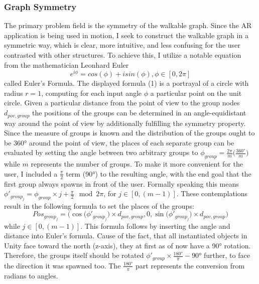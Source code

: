 \documentclass[12pt,a4paper,oneside,american,parskip=half]{article}
\begin{document}
\begin{justify}
\begin{normalsize}
\subsubsection{Graph Symmetry}
The primary problem field is the symmetry of the walkable graph. Since the AR application is being used in motion, I seek to construct the walkable graph in a symmetric way, which is clear, more intuitive, and less confusing for the user contrasted with other structures.
\newline
To achieve this, I utilize a notable equation from the mathematician Leonhard Euler
\begin{equation}
e^{i \phi} = cos(\phi) + i sin(\phi), \phi \in [0, 2 \pi]
\end{equation}
called Euler's Formula. The displayed formula (1) is a portrayal of a circle with radius $ r = 1 $, computing for each input angle $\phi$ a particular point on the unit circle.
\newline
Given a particular distance from the point of view to the group nodes $d_{pov, group}$ the positions of the groups can be determined in an angle-equidistant way around the point of view by additionally fulfilling the symmetry property. Since the measure of groups is known and the distribution of the groups ought to be 360° around the point of view, the places of each separate group can be evaluated by setting the angle between two arbitrary groups to $\phi_{group} = \frac{2\pi}{m} \big(\frac{360°}{m}\big)$ while $m$ represents the number of groups. To make it more convenient for the user, I included a $\frac{\pi}{2}$ term (90°) to the resulting angle, with the end goal that the first group always spawns in front of the user. Formally speaking this means $\phi'_{group_{j}} = \phi_{group} \times j + \frac{\pi}{2} \mod 2\pi$, for $ j \in [0, (m - 1)]$.
\newline
These contemplations result in the following formula to set the places of the groups:
\begin{equation}
Pos_{group_{j}} = \Big(\cos \big(\phi'_{group_j} \big) \times d_{pov, group} , 0, \sin \big(\phi'_{group_j}\big) \times d_{pov, group} \Big)
\end{equation} while $ j \in [0, (m - 1)]$. This formula follows by inserting the angle and distance into Euler's formula.
Cause of the fact, that all instantiated objects in Unity face toward the north (z-axis), they at first as of now have a 90° rotation. Therefore, the groups itself should be rotated $\phi'_{group} \times \frac{180°}{\pi} - 90°$ further, to face the direction it was spawned too. The $ \frac{180°}{\pi}$ part represents the conversion from radians to angles.

\end{normalsize}
\end{justify}
\end{document}
